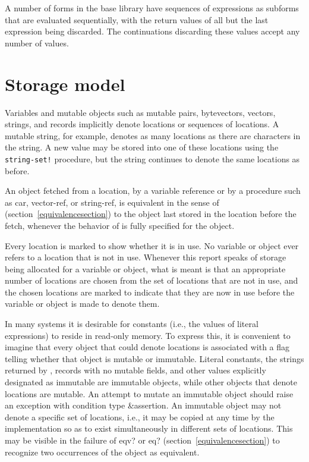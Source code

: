 A number of forms in the base library have sequences of expressions
as subforms that are evaluated sequentially, with the return values of
all but the last expression being discarded.  The continuations
discarding these values accept any number of values.

\section{Storage model}
\label{storagemodel}

Variables and mutable objects such as mutable pairs, bytevectors, vectors, strings,
and records implicitly
denote locations or sequences of locations.  A
mutable string, for example, denotes as many locations as there are characters in the string. 
A new value may be
stored into one of these locations using the {\tt string-set!} procedure, but
the string continues to denote the same locations as before.

An object fetched from a location, by a variable reference or by
a procedure such as {\cf car}, {\cf vector-ref}, or {\cf string-ref}, is
equivalent in the sense of  %
(section~\ref{equivalencesection})
to the object last stored in the location before the fetch, whenever
the behavior of  is fully specified for the object.

Every location is marked to show whether it is in use.
No variable or object ever refers to a location that is not in use.
Whenever this report speaks of storage being allocated for a variable
or object, what is meant is that an appropriate number of locations are
chosen from the set of locations that are not in use, and the chosen
locations are marked to indicate that they are now in use before the variable
or object is made to denote them.

In many systems it is desirable for constants (i.e., the values of
literal expressions) to reside in read-only memory.  To express this,
it is convenient to imagine that every object that could denote locations
is associated with a flag telling whether that object is
mutable or immutable.  Literal
constants, the strings returned by , records with
no mutable fields, and other values explicitly designated as immutable
are immutable objects, while other objects that denote locations
are mutable.  
An attempt to mutate an immutable object
should raise an exception with condition type {\cf\&assertion}.
An immutable object may not denote a specific set of locations, i.e.,
it may be copied at any time by the implementation so as to exist
simultaneously in different sets of locations.
This may be visible in the failure of {\cf eqv?} or {\cf eq?}
(section~\ref{equivalencesection}) to
recognize two occurrences of the object as equivalent.

